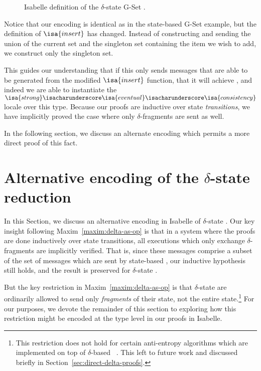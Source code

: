\begin{figure}[H]
  
  \caption{Isabelle definition of the $\delta$-state G-Set \CRDT.}
\end{figure}

Notice that our encoding is identical as in the state-based G-Set example, but
the definition of $\isa{insert}$ has changed. Instead of constructing and
sending the union of the current set and the singleton set containing the item
we wish to add, we construct only the singleton set.

This guides our understanding that if this \CRDT only sends messages that are
able to be generated from the modified $\isa{insert}$ function, that it will
achieve \SEC, and indeed we are able to instantiate the
$\isa{strong}\isacharunderscore\isa{eventual}\isacharunderscore\isa{consistency}$
locale over this type. Because our proofs are inductive over state
\emph{transitions}, we have implicitly proved the case where only
$\delta$-fragments are sent as well.

In the following section, we discuss an alternate encoding which permits a more
direct proof of this fact.

\section{Alternative encoding of the $\delta$-state reduction}
\label{sec:alternate-delta-encoding}

In this Section, we discuss an alternative encoding in Isabelle of
$\delta$-state \CRDTs. Our key insight following
Maxim~\ref{maxim:delta-as-op} is that in a system where the proofs are done
inductively over state transitions, all executions which only exchange
$\delta$-fragments are implicitly verified. That is, since these messages
comprise a subset of the set of messages which are sent by state-based \CRDTs,
our inductive hypothesis still holds, and the result is preserved for
$\delta$-state \CRDTs.

But the key restriction in Maxim~\ref{maxim:delta-as-op} is that
$\delta$-state \CRDTs are ordinarily allowed to send only \emph{fragments} of
their state, not the entire state.\footnote{This restriction does not hold for
certain anti-entropy algorithms which are implemented on top of $\delta$-based
\CRDTs~\citep{almedia18}. This left to future work and discussed briefly in
Section~\ref{sec:direct-delta-proofs}.} For our purposes, we devote the
remainder of this section to exploring how this restriction might be encoded at
the type level in our proofs in Isabelle.

